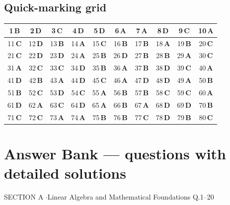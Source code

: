 \documentclass[11pt,a4paper]{article}
\begin{document}
\subsection*{Quick-marking grid}
\begin{center}\renewcommand{\arraystretch}{1.3}
\begin{tabular}{|c|c|c|c|c|c|c|c|c|c|}\hline
1\,\textbf{B} & 2\,\textbf{D} & 3\,\textbf{C} & 4\,\textbf{D} & 5\,\textbf{D} & 6\,\textbf{A} & 7\,\textbf{A} & 8\,\textbf{D} & 9\,\textbf{C} & 10\,\textbf{A} \\
\hline
11\,\textbf{C} & 12\,\textbf{D} & 13\,\textbf{B} & 14\,\textbf{A} & 15\,\textbf{C} & 16\,\textbf{B} & 17\,\textbf{B} & 18\,\textbf{A} & 19\,\textbf{B} & 20\,\textbf{C} \\
\hline
21\,\textbf{C} & 22\,\textbf{D} & 23\,\textbf{D} & 24\,\textbf{A} & 25\,\textbf{B} & 26\,\textbf{D} & 27\,\textbf{B} & 28\,\textbf{B} & 29\,\textbf{A} & 30\,\textbf{C} \\
\hline
31\,\textbf{A} & 32\,\textbf{C} & 33\,\textbf{C} & 34\,\textbf{D} & 35\,\textbf{B} & 36\,\textbf{A} & 37\,\textbf{B} & 38\,\textbf{D} & 39\,\textbf{C} & 40\,\textbf{A} \\
\hline
41\,\textbf{D} & 42\,\textbf{B} & 43\,\textbf{A} & 44\,\textbf{D} & 45\,\textbf{C} & 46\,\textbf{A} & 47\,\textbf{D} & 48\,\textbf{D} & 49\,\textbf{A} & 50\,\textbf{B} \\
\hline
51\,\textbf{B} & 52\,\textbf{C} & 53\,\textbf{D} & 54\,\textbf{C} & 55\,\textbf{A} & 56\,\textbf{B} & 57\,\textbf{B} & 58\,\textbf{C} & 59\,\textbf{C} & 60\,\textbf{A} \\
\hline
61\,\textbf{D} & 62\,\textbf{A} & 63\,\textbf{C} & 64\,\textbf{D} & 65\,\textbf{A} & 66\,\textbf{B} & 67\,\textbf{A} & 68\,\textbf{D} & 69\,\textbf{D} & 70\,\textbf{B} \\
\hline
71\,\textbf{C} & 72\,\textbf{C} & 73\,\textbf{A} & 74\,\textbf{A} & 75\,\textbf{B} & 76\,\textbf{B} & 77\,\textbf{C} & 78\,\textbf{D} & 79\,\textbf{B} & 80\,\textbf{C} \\
\hline\end{tabular}\end{center}
\newpage
\section*{Answer Bank --- questions with detailed solutions}\label{bank}

\begin{sectionbanner}SECTION A \enspace$\cdot$\enspace Linear Algebra and Mathematical Foundations \hfill Q.1--20\end{sectionbanner}
\end{document}
